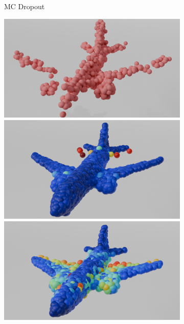 \begin{figure}[htb]
\begin{subfigure}[t]{0.315\textwidth}
            \caption{MC Dropout}
          \end{subfigure}\hfill
          \begin{subfigure}[t]{0.315\textwidth}
            \includegraphics[width=\textwidth]{figures/part_ap.png}
            \includegraphics[width=\textwidth]{figures/5z_ap_imle.png}
            \includegraphics[width=\textwidth]{figures/10z_ap_imle.png}

\end{subfigure}
\end{figure}
